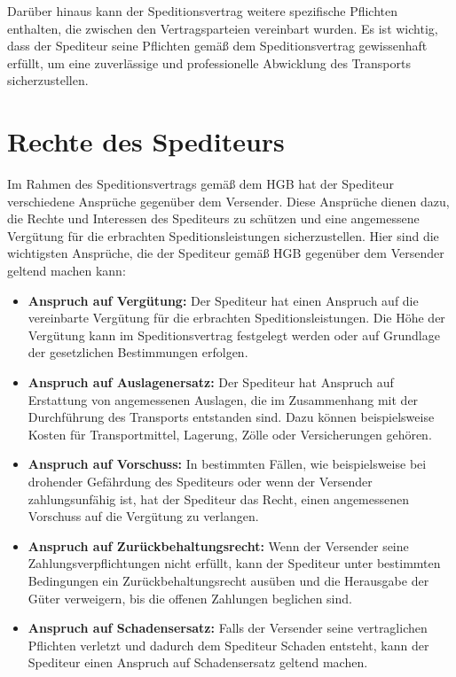 Darüber hinaus kann der Speditionsvertrag weitere spezifische Pflichten enthalten, die zwischen den Vertragsparteien vereinbart wurden. Es ist wichtig, dass der Spediteur seine Pflichten gemäß dem Speditionsvertrag gewissenhaft erfüllt, um eine zuverlässige und professionelle Abwicklung des Transports sicherzustellen.

\section{Rechte des Spediteurs}
Im Rahmen des Speditionsvertrags gemäß dem \ac{HGB} hat der Spediteur verschiedene Ansprüche gegenüber dem Versender. Diese Ansprüche dienen dazu, die Rechte und Interessen des Spediteurs zu schützen und eine angemessene Vergütung für die erbrachten Speditionsleistungen sicherzustellen. Hier sind die wichtigsten Ansprüche, die der Spediteur gemäß HGB gegenüber dem Versender geltend machen kann:
\begin{itemize}
    \item \textbf{Anspruch auf Vergütung:} Der Spediteur hat einen Anspruch auf die vereinbarte Vergütung für die erbrachten Speditionsleistungen. Die Höhe der Vergütung kann im Speditionsvertrag festgelegt werden oder auf Grundlage der gesetzlichen Bestimmungen erfolgen.
    \item \textbf{Anspruch auf Auslagenersatz:} Der Spediteur hat Anspruch auf Erstattung von angemessenen Auslagen, die im Zusammenhang mit der Durchführung des Transports entstanden sind. Dazu können beispielsweise Kosten für Transportmittel, Lagerung, Zölle oder Versicherungen gehören.
    \item \textbf{Anspruch auf Vorschuss:} In bestimmten Fällen, wie beispielsweise bei drohender Gefährdung des Spediteurs oder wenn der Versender zahlungsunfähig ist, hat der Spediteur das Recht, einen angemessenen Vorschuss auf die Vergütung zu verlangen.
    \item \textbf{Anspruch auf Zurückbehaltungsrecht:} Wenn der Versender seine Zahlungsverpflichtungen nicht erfüllt, kann der Spediteur unter bestimmten Bedingungen ein Zurückbehaltungsrecht ausüben und die Herausgabe der Güter verweigern, bis die offenen Zahlungen beglichen sind.
    \item \textbf{Anspruch auf Schadensersatz:} Falls der Versender seine vertraglichen Pflichten verletzt und dadurch dem Spediteur Schaden entsteht, kann der Spediteur einen Anspruch auf Schadensersatz geltend machen.
\end{itemize}

